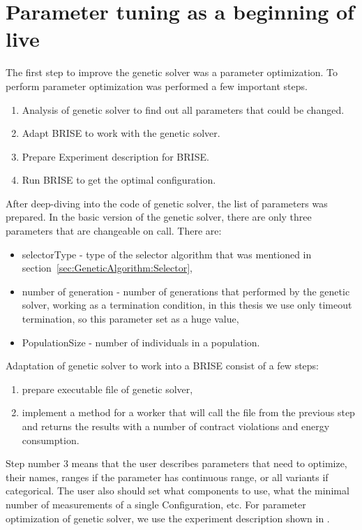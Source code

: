 \section{Parameter tuning as a beginning of live}
The first step to improve the genetic solver was a parameter optimization. To perform parameter optimization was performed a few important steps.
\begin{enumerate}
	\item Analysis of genetic solver to find out all parameters that could be changed. 
	\item Adapt BRISE to work with the genetic solver.
	\item Prepare Experiment description for BRISE.
	\item Run BRISE to get the optimal configuration.
\end{enumerate}

After deep-diving into the code of genetic solver, the list of parameters was prepared.
In the basic version of the genetic solver, there are only three parameters that are changeable on call. There are:
\begin{itemize}
	\item selectorType - type of the selector algorithm that was mentioned in section~\ref{sec:GeneticAlgorithm:Selector},
	\item number of generation - number of generations that performed by the genetic solver, working as a termination condition, in this thesis we use only timeout termination, so this parameter set as a huge value,
	\item PopulationSize - number of individuals in a population.
\end{itemize}

Adaptation of genetic solver to work into a BRISE consist of a few steps:
\begin{enumerate}
	\item prepare executable file of genetic solver,
	\item implement a method for a worker that will call the file from the previous step and returns the results with a number of contract violations and energy consumption.
\end{enumerate}

Step number 3 means that the user describes parameters that need to optimize, their names, ranges if the parameter has continuous range, or all variants if categorical. The user also should set what components to use, what the minimal number of measurements of a single Configuration, etc.
For parameter optimization of genetic solver, we use the experiment description shown in .

